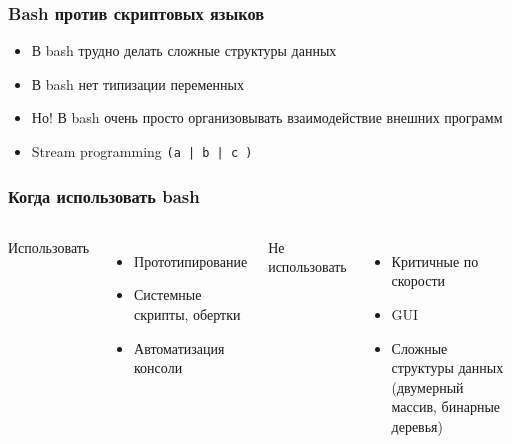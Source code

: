 \begin{frame}
  \frametitle{Bash против скриптовых языков}
  \begin{itemize}
   \item В bash трудно делать сложные структуры данных
   \item В bash нет типизации переменных
   \item Но! В bash очень просто организовывать взаимодействие внешних программ
   \item Stream programming \texttt{(a | b | c )}
  \end{itemize}
\end{frame}

\begin{frame}
  \frametitle{Когда использовать bash}
  \begin{columns}
    \begin{center}
     {\Large Использовать}
    \end{center}
    \begin{itemize}
      \item Прототипирование
      \item Системные скрипты, обертки
      \item Автоматизация консоли
    \end{itemize}
    \begin{center}
     {\Large Не использовать}
    \end{center}
    \begin{itemize}
      \item Критичные по скорости
      \item GUI
      \item Сложные структуры данных (двумерный массив, бинарные деревья)
    \end{itemize}
  \end{columns}
\end{frame}
